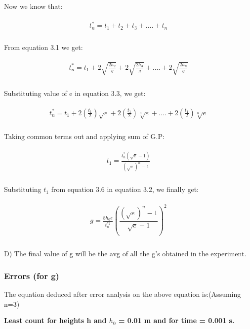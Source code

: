 \documentclass[11pt]{scrartcl} %
\begin{document}
Now we know that:\par
\begin{align} 
	\begin{split}
		 t_n^*=t_1+t_2+t_3 +....+ t_n \\
	\end{split}					
\end{align}

From equation 3.1 we get:\par


\begin{align} 
	\begin{split}
		 t_n^*=t_1+2\sqrt{\frac{2h_2}{g}}+2\sqrt{\frac{2h_3}{g}}+....+2\sqrt{\frac{2h_n}{g}}\\
	\end{split}					
\end{align}

Substituting value of e in equation 3.3, we get:\par

\begin{align} 
	\begin{split}
		 t_n^*=t_1+2(\frac{t_1}{2})\sqrt{e}+2(\frac{t_1}{2})\sqrt[3]{e}+....+2(\frac{t_1}{2})\sqrt[n]{e}\\
	\end{split}					
\end{align}

Taking common terms out and applying sum of G.P:\par
\begin{align} 
	\begin{split}
		 t_1=\frac{t_n^*(\sqrt{e}-1)}{(\sqrt{e})^n-1}\\
	\end{split}					
\end{align}

Substituting $t_1$ from equation 3.6 in equation 3.2, we finally get:\par
\begin{align} 
	\begin{split}
		\boxed{g = \frac{8h_0e}{t_{n}^{*2}}\left(\dfrac{(\sqrt{e})^n-1}{\sqrt{e}-1}\right)^2}\\
	\end{split}					
\end{align}
	 
D) The final value of g will be the avg of all the g’s obtained in the experiment. \par

\subsubsection{Errors (for g)}
The equation deduced after error analysis on the above equation is:(Assuming n=3)\par
\textbf{Least count for heights h and $h_0$ = 0.01 m and for time = 0.001 s.}\par
\end{document}
